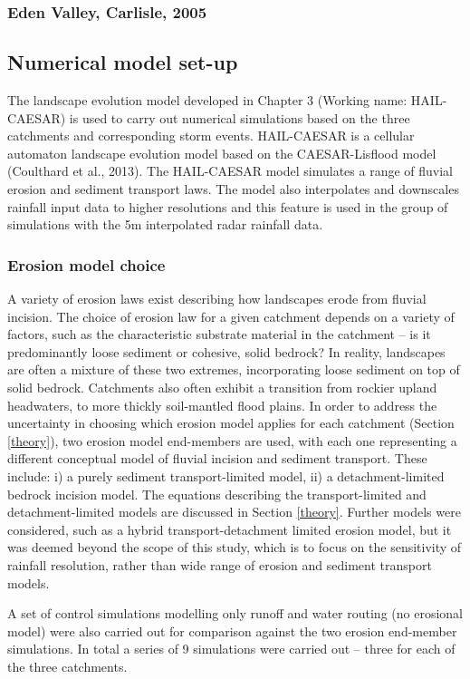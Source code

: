 \documentclass[12pt,oneside,PhD]{muthesis}
\begin{document}
\subsubsection{Eden Valley, Carlisle, 2005}

\subsection{Numerical model set-up}
The landscape evolution model developed in Chapter 3 (Working name: HAIL-CAESAR) is used to carry out numerical simulations based on the three catchments and corresponding storm events. HAIL-CAESAR is a cellular automaton landscape evolution model based on the CAESAR-Lisflood model (Coulthard et al., 2013). The HAIL-CAESAR model simulates a range of fluvial erosion and sediment transport laws. The model also interpolates and downscales rainfall input data to higher resolutions and this feature is used in the group of simulations with the 5m interpolated radar rainfall data. 

\subsubsection{Erosion model choice}
A variety of erosion laws exist describing how landscapes erode from fluvial incision. The choice of erosion law for a given catchment depends on a variety of factors, such as the characteristic substrate material in the catchment -- is it predominantly loose sediment or cohesive, solid bedrock? In reality, landscapes are often a mixture of these two extremes, incorporating loose sediment on top of solid bedrock. Catchments also often exhibit a transition from rockier upland headwaters, to more thickly soil-mantled flood plains. In order to address the uncertainty in choosing which erosion model applies for each catchment (Section \ref{theory}), two erosion model end-members are used, with each one representing a different conceptual model of fluvial incision and sediment transport. These include: i) a purely sediment transport-limited model, ii) a detachment-limited bedrock incision model. The equations describing the transport-limited and detachment-limited models are discussed in Section \ref{theory}. Further models were considered, such as a hybrid transport-detachment limited erosion model, but it was deemed beyond the scope of this study, which is to focus on the sensitivity of rainfall resolution, rather than wide range of erosion and sediment transport models. 

A set of control simulations modelling only runoff and water routing (no erosional model) were also carried out for comparison against the two erosion end-member simulations. In total a series of 9 simulations were carried out -- three for each of the three catchments.
\end{document}
